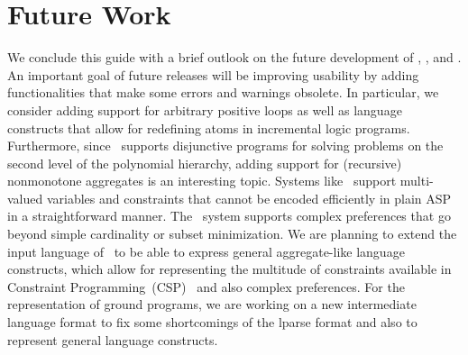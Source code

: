 \section{Future Work}\label{sec:future}

We conclude this guide with a brief outlook on the future development
of \gringo, \clasp, and \clingo.
An important goal of future releases will be improving usability
by adding functionalities that make some errors and warnings obsolete.
In particular, we consider adding support for arbitrary positive loops
as well as language constructs that allow for redefining atoms in incremental logic programs.
Furthermore, since \clasp\ supports disjunctive programs for solving problems on the second level of the polynomial hierarchy, 
adding support for (recursive) nonmonotone aggregates is an interesting topic.
Systems like \clingcon\ support multi-valued variables and constraints that cannot be encoded efficiently in plain ASP in a straightforward manner.
The \asprin\ system supports complex preferences that go beyond simple cardinality or subset minimization.
We are planning to extend the input language of \gringo\ to be able to express general aggregate-like language constructs,
which allow for representing the multitude of constraints available in Constraint Programming~(CSP)~\cite{CPHandbook} 
and also complex preferences.
For the representation of ground programs,
we are working on a new intermediate language format to fix some shortcomings of the lparse format
and also to represent general language constructs.


